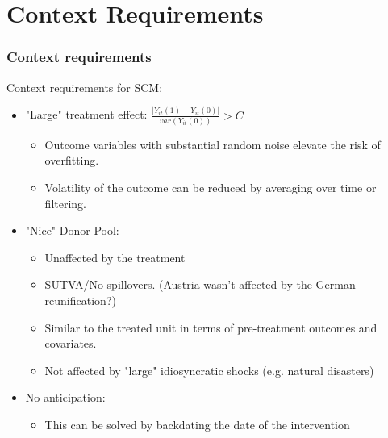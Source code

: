 \documentclass[xcolor=svgnames,t]{beamer}
\newcommand{\myitem}{\item[$\circ$]}
\begin{document}
\section{Context Requirements}
\begin{frame}
    \frametitle{Context requirements}
    Context requirements for SCM:
    \begin{itemize}
        \item <1->  "Large" treatment effect: $\frac{|Y_{it}(1)-Y_{it}(0)|}{var(Y_{it}(0))}>C $ 
        \begin{itemize}
            \myitem  <2->  Outcome variables with substantial random noise elevate the risk of overfitting.
            \myitem  <3-> Volatility of the outcome can be reduced by averaging over time or filtering. \citep{amjad2018robust} 
        \end{itemize}
        \item  <4->  "Nice" Donor Pool:
        \begin{itemize}
            \myitem <5-> Unaffected by the treatment
            \myitem <6->  SUTVA/No spillovers. (Austria wasn't affected by the German reunification?)
            \myitem <7-> Similar to the treated unit in terms of pre-treatment outcomes and covariates.
            \myitem <8-> Not affected by "large" idiosyncratic shocks (e.g. natural disasters)
        \end{itemize}
        \item <9->  No anticipation:
         \begin{itemize}
            \myitem <10-> This can be solved by backdating the date of the intervention
            
        \end{itemize}
    \end{itemize}

\end{frame}
\end{document}
